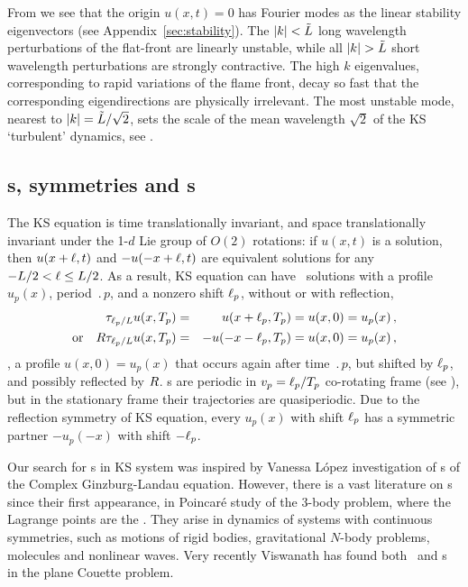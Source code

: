 From  we see that the origin $u(x,t) = 0$
has Fourier modes as the linear stability eigenvectors 
(see Appendix~\ref{sec:stability}).  The $|k|<\tilde{L}$
long wavelength perturbations of the flat-front {\eqv}
are linearly unstable, while all
$|k|> \tildeL$ short wavelength perturbations are strongly contractive.
The high $k$ eigenvalues, corresponding to rapid variations of
the flame front, decay so fast that the corresponding eigendirections
are physically irrelevant.
The most unstable mode, nearest to $|k|=\tilde{L}/\sqrt{2}$,
sets the scale of the mean wavelength $\sqrt{2}$
of the KS `turbulent' dynamics,
see .


\subsection{\Rpo s, symmetries and \po s} \label{sec:KSePO}

The KS equation  is time translationally invariant, and
space translationally invariant under the 1-$d$ Lie group of $O(2)$
rotations: if $u(x,t)$ is a solution, then $u(x+\ell,t)$ and
$-u(-x+\ell,t)$ are equivalent solutions for any $-L/2 < \ell \leq
L/2$.  As a result, KS equation can have
\rpo\ solutions with a profile $u_p(x)$, period $\period{p}$, and a 
nonzero shift $\ell_p$, without or with reflection,
\begin{eqnarray}
  \Shift_{\shift_p/L}u(x,\period{p}) &=& 
  u(x+\shift_p,\period{p}) = u(x,0) = u_p(x)\,,
\label{KSrpos} \\
  \mbox{or} \quad \Refl\Shift_{\shift_p/L} u(x,\period{p}) &=& 
  -u(-x-\shift_p,\period{p}) = u(x,0) = u_p(x)\,,
\label{KSpos}
\end{eqnarray}
\ie, a profile $u(x,0) = u_p(x)$ that occurs again after time
$\period{p}$, but shifted by $\ell_p$, and possibly reflected by
$R$.  {\Rpo s}  are periodic in
$v_p=\ell_p/{T_{p}}$ co-rotating frame (see
), but in the stationary frame their
trajectories are quasiperiodic.  Due to the reflection symmetry
 of KS equation, every {\rpo} $u_p(x)$ with shift
$\ell_p$ has a symmetric partner $-u_p(-x)$ with shift $-\ell_p$.

Our search for \rpo s in KS system was inspired by Vanessa
L{\'o}pez investigation of {\rpo s} of the Complex
Ginzburg-Landau equation.  However, there is a vast literature on
{\rpo s} since their first appearance, in Poincar\'e study of the
3-body problem, where the Lagrange points are
the \reqva.  They arise in dynamics of systems with continuous
symmetries, such as motions of rigid bodies, gravitational $N$-body
problems, molecules and nonlinear waves.
Very recently Viswanath %
has found both \reqva\ and \rpo s in the plane Couette problem.

